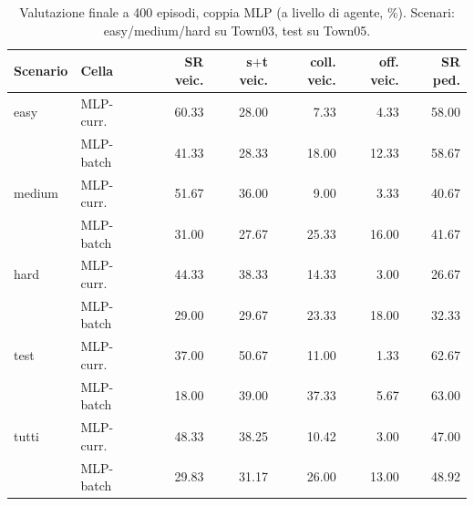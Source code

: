 \begin{table}[t]
  \centering\small
  \caption{Valutazione finale a 400 episodi, coppia MLP (a livello di
  agente, \%). Scenari: easy/medium/hard su Town03, test su Town05.}
  \label{tab:eval-mlp}
  \begin{tabular}{@{}llrrrrr@{}}
    \toprule
    Scenario & Cella & SR veic. & s$+$t veic. & coll. veic. & off. veic. & SR ped. \\
    \midrule
    easy   & MLP-curr.\ & 60.33 & 28.00 & 7.33 & 4.33 & 58.00 \\
           & MLP-batch  & 41.33 & 28.33 & 18.00 & 12.33 & 58.67 \\
    medium & MLP-curr.\ & 51.67 & 36.00 & 9.00 & 3.33 & 40.67 \\
           & MLP-batch  & 31.00 & 27.67 & 25.33 & 16.00 & 41.67 \\
    hard   & MLP-curr.\ & 44.33 & 38.33 & 14.33 & 3.00 & 26.67 \\
           & MLP-batch  & 29.00 & 29.67 & 23.33 & 18.00 & 32.33 \\
    test   & MLP-curr.\ & 37.00 & 50.67 & 11.00 & 1.33 & 62.67 \\
           & MLP-batch  & 18.00 & 39.00 & 37.33 & 5.67 & 63.00 \\
    \midrule
    tutti  & MLP-curr.\ & 48.33 & 38.25 & 10.42 & 3.00 & 47.00 \\
           & MLP-batch  & 29.83 & 31.17 & 26.00 & 13.00 & 48.92 \\
    \bottomrule
  \end{tabular}
\end{table}

